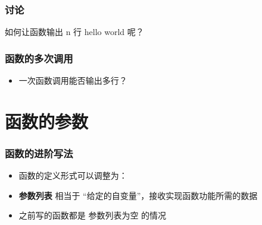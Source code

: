 \begin{frame}[fragile]
    \frametitle{讨论}

    \begin{block}{}
        \vspace{.5cm}
        \begin{center}
            {\Large 如何让函数输出 n 行 hello world 呢？}
        \end{center}
        \vspace{.5cm}
    \end{block}
\end{frame}

\begin{frame}[fragile]
    \frametitle{函数的多次调用}
    
    
    \begin{itemize}
        \item<2-> 一次函数调用能否输出多行？
    \end{itemize}
\end{frame}

\section{函数的参数}

\begin{frame}[fragile]
    \frametitle{函数的进阶写法}

    \begin{itemize}[<+->]
        \item 函数的定义形式可以调整为：
        
        \item \textbf{参数列表} 相当于 “给定的自变量”，接收实现函数功能所需的数据
        \item 之前写的函数都是 参数列表为空 的情况
    \end{itemize}
\end{frame}

